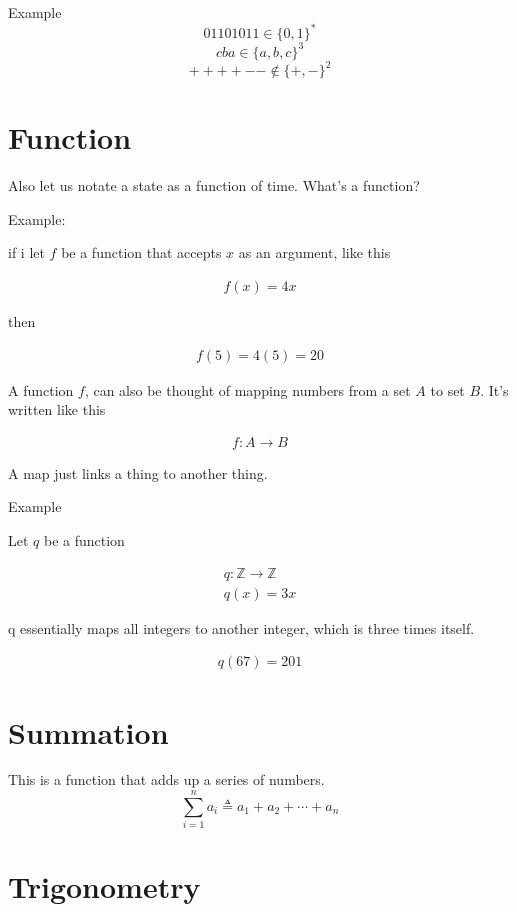 \documentclass[
]{article}
\providecommand{\rarr}{\rightarrow}
\providecommand{\Z}{\mathbb{Z}}
\begin{document}
Example
\[
	01101011 \in \{0,1\}^*
\]
\[
	cba \in \{a,b,c\}^3
\]
\[
	++++-- \notin \{+,-\}^2
\]


\section{Function}\label{functions}

Also let us notate a state as a function of time. What's a function?

Example:

if i let \(f\) be a function that accepts \(x\) as an argument, like
this

\begin{gather*}
	f(x)=4x
\end{gather*}

then

\begin{gather*}
	f(5)=4(5)=20
\end{gather*}

A function \(f\), can also be thought of mapping numbers from a set \(A\) to set \(B\). It's
written like this

\begin{gather*}
	f:A\rarr B
\end{gather*}

A map just links a thing to another thing.

Example

Let \(q\) be a function

\begin{gather*}
	q:\Z\rarr\Z\\
	q(x)=3x
\end{gather*}

q essentially maps all integers to another integer, which is three times
itself.

\begin{gather*}
	q(67)=201
\end{gather*}

\section{Summation}\label{summation}
This is a function that adds up a series of numbers.
\[
	\sum_{i=1}^n a_i \triangleq a_1 + a_2 + \cdots + a_n
\]

\section{Trigonometry}\label{trigonometry}
\end{document}
